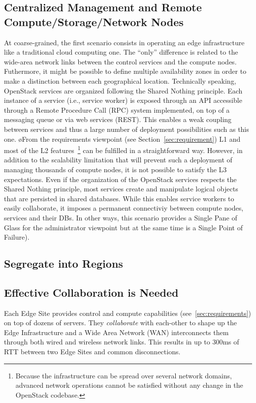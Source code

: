 \subsection{Centralized Management and Remote Compute/Storage/Network Nodes}
\label{subsec:centralized_os}
At coarse-grained, the first scenario consists in operating an edge
infrastructure like a traditional cloud computing one.  The ``only''
difference is related to the wide-area network links between the
control services and the compute nodes.  Futhermore, it might be
possible to define multiple availability zones in order to make a
distinction between each geographical location.
%
Technically speaking, OpenStack services are organized following the Shared Nothing
principle. Each instance of a service (i.e., service worker) is
exposed through an API accessible through a Remote Procedure Call
(RPC) system implemented, on top of a messaging queue or via web
services (REST). This enables a weak coupling between services and
thus a large number of deployment possibilities such as this one.
%
øFrom the requirements viewpoint (see Section~\ref{sec:requirement}) L1
and most of the L2 features~\footnote{Because the infrastructure can
  be spread over several network domains, advanced network operations
  cannot be satisfied without any change in the OpenStack codebase.}
can be fulfilled in a straightforward way.  However, in addition to
the scalability limitation that will prevent such a deployment of
managing thousands of compute nodes, it is not possible to satisfy the
L3 expectations.  Even if the organization of the OpenStack services
respects the Shared Nothing principle, most services create and
manipulate logical objects that are persisted in shared
databases. While this enables service workers to easily collaborate,
it imposes a permanent connectiviy between compute nodes, services and
their DBs. In other ways, this scenario provides a Single Pane of
Glass for the administrator viewpoint but at the same time is a Single
Point of Failure).


\subsection{Segregate into Regions}


\subsection{Effective Collaboration is Needed}
Each Edge Site
provides control and compute capabilities (see~\ref{sec:requirements})
on top of dozens of servers. They \emph{collaborate} with each-other
to shape up the Edge Infrastructure and a Wide Area Network (WAN)
interconnects them through both wired and wireless network links. This
results in up to 300ms of RTT between two Edge Sites and common
disconnections.

